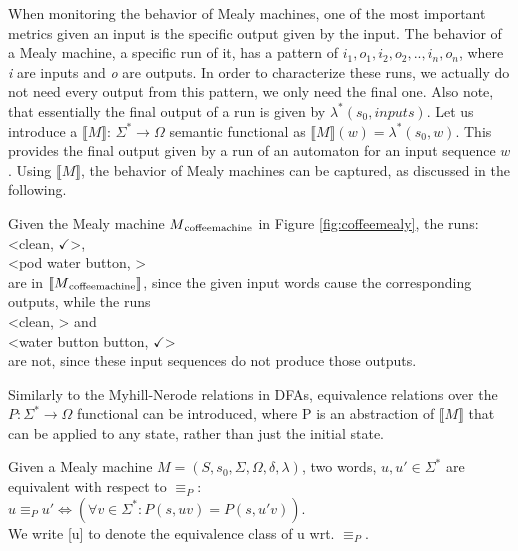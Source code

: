 When monitoring the behavior of Mealy machines, one of the most important metrics given an input is the specific output given by the input. The behavior of a Mealy machine, a specific run of it, has a pattern of \textit{$i_1,o_1,i_2,o_2,..,i_n,o_n$}, where \textit{i} are inputs and \textit{o} are outputs. In order to characterize these runs, we actually do not need every output from this pattern, we only need the final one. Also note, that essentially the final output of a run is given by $\lambda^*(s_0, inputs)$. Let us introduce a $\llbracket M\rrbracket$: $\Sigma^*\to\Omega$ semantic functional as  $\llbracket M\rrbracket(w) = \lambda^*(s_0, w)$. This provides the final output given by a run of an automaton for an input sequence $w$. Using $\llbracket M\rrbracket$, the behavior of Mealy machines can be captured, as discussed in the following.

\begin{example}
	Given the Mealy machine $M\textsubscript{coffeemachine}$ in Figure \ref{fig:coffeemealy}, the runs:\\
	\null\qquad<clean, $\checkmark$>, \\
	\null\qquad<pod water button, \Coffeecup> \\
	are in $\llbracket M\textsubscript{coffeemachine}\rrbracket$, since the given input words cause the corresponding outputs, while the runs\\
	\null\qquad<clean, \Coffeecup> and \\
	\null\qquad<water button button, $\checkmark$> \\
	are not, since these input sequences do not produce those outputs.
\end{example}

Similarly to the Myhill-Nerode relations in DFAs, equivalence relations over the $P: \Sigma^*\to\Omega$ functional can be introduced, where P is an abstraction of  $\llbracket M\rrbracket$ that can be applied to any state, rather than just the initial state.

\begin{definition}
	Given a Mealy machine $M=(S,s_{0},\Sigma,\Omega,\delta,\lambda) $, two words, $u, u'\in\Sigma^*$ are equivalent with respect to $\equiv_P$:\\
	$u \equiv_P u' \iff (\forall v\in\Sigma^*:P(s, uv) = P(s, u'v))$.\\
	We write [u] to denote the equivalence class of u wrt. $\equiv_P$.
\end{definition}

